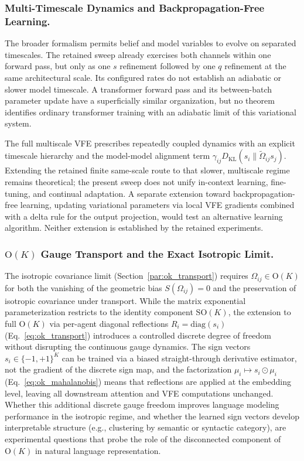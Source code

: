 \documentclass[twoside,11pt]{article}
\begin{document}
\subsubsection{Multi-Timescale Dynamics and Backpropagation-Free Learning.}

The broader formalism permits belief and model variables to evolve on separated timescales. The retained sweep already exercises both channels within one forward pass, but only as one $s$ refinement followed by one $q$ refinement at the same architectural scale. Its configured rates do not establish an adiabatic or slower model timescale. A transformer forward pass and its between-batch parameter update have a superficially similar organization, but no theorem identifies ordinary transformer training with an adiabatic limit of this variational system.

The full multiscale VFE prescribes repeatedly coupled dynamics with an explicit timescale hierarchy and the model-model alignment term $\gamma_{ij} D_{\mathrm{KL}}(s_i \| \tilde{\Omega}_{ij} s_j)$. Extending the retained finite same-scale route to that slower, multiscale regime remains theoretical; the present sweep does not unify in-context learning, fine-tuning, and continual adaptation. A separate extension toward backpropagation-free learning, updating variational parameters via local VFE gradients combined with a delta rule for the output projection, would test an alternative learning algorithm. Neither extension is established by the retained experiments.

\subsubsection{$\mathrm{O}(K)$ Gauge Transport and the Exact Isotropic Limit.}

The isotropic covariance limit (Section~\ref{par:ok_transport}) requires $\Omega_{ij} \in \mathrm{O}(K)$ for both the vanishing of the geometric bias $S(\Omega_{ij}) = 0$ and the preservation of isotropic covariance under transport. While the matrix exponential parameterization restricts to the identity component $\mathrm{SO}(K)$, the extension to full $\mathrm{O}(K)$ via per-agent diagonal reflections $R_i = \mathrm{diag}(s_i)$ (Eq.~\ref{eq:ok_transport}) introduces a controlled discrete degree of freedom without disrupting the continuous gauge dynamics. The sign vectors $s_i \in \{-1,+1\}^K$ can be trained via a biased straight-through derivative estimator, not the gradient of the discrete sign map, and the factorization $\mu_i \mapsto s_i \odot \mu_i$ (Eq.~\ref{eq:ok_mahalanobis}) means that reflections are applied at the embedding level, leaving all downstream attention and VFE computations unchanged. Whether this additional discrete gauge freedom improves language modeling performance in the isotropic regime, and whether the learned sign vectors develop interpretable structure (e.g., clustering by semantic or syntactic category), are experimental questions that probe the role of the disconnected component of $\mathrm{O}(K)$ in natural language representation.
\end{document}
